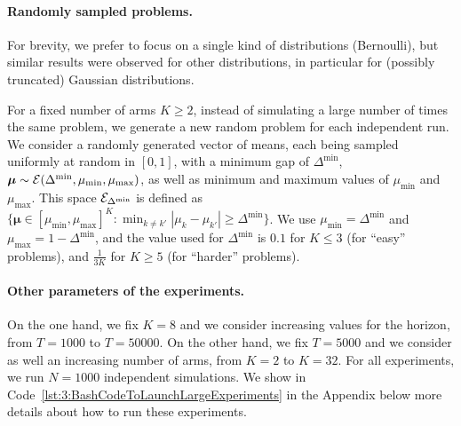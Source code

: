 \paragraph{Randomly sampled problems.}
%
For brevity, we prefer to focus on a single kind of distributions (Bernoulli),
but similar results were observed for other distributions, in particular for (possibly truncated) Gaussian distributions.
%

For a fixed number of arms $K \geq 2$,
instead of simulating a large number of times the same problem,
we generate a new random problem for each independent run.
%
We consider a randomly generated vector of means, each being sampled uniformly at random in $[0,1]$, with a minimum gap of $\Delta^{\min}$, $\bm{\mu} \sim \mathcal{E}(\Delta^{\min},\mu_{\min},\mu_{\max})$, as well as minimum and maximum values of $\mu_{\min}$ and $\mu_{\max}$.
This space $\mathcal{E}_{\Delta^{\min}}$ is defined as $\{ \bm{\mu} \in [\mu_{\min}, \mu_{\max}]^K : \min_{k\neq k'} |\mu_k - \mu_{k'}| \geq \Delta^{\min} \}$.
We use $\mu_{\min} = \Delta^{\min}$ and $\mu_{\max} = 1 - \Delta^{\min}$,
and the value used for $\Delta^{\min}$ is $0.1$ for $K \leq 3$ (for ``easy'' problems), and $\frac{1}{3 K}$ for $K \geq 5$ (for ``harder'' problems).


\paragraph{Other parameters of the experiments.}
%
On the one hand, we fix $K=8$ and we consider increasing values for the horizon, from $T=1000$ to $T=50000$.
On the other hand, we fix $T=5000$ and we consider as well an increasing number of arms, from $K=2$ to $K=32$.
For all experiments, we run $N=1000$ independent simulations.
We show in Code~\ref{lst:3:BashCodeToLaunchLargeExperiments} in the Appendix below more details about how to run these experiments.

